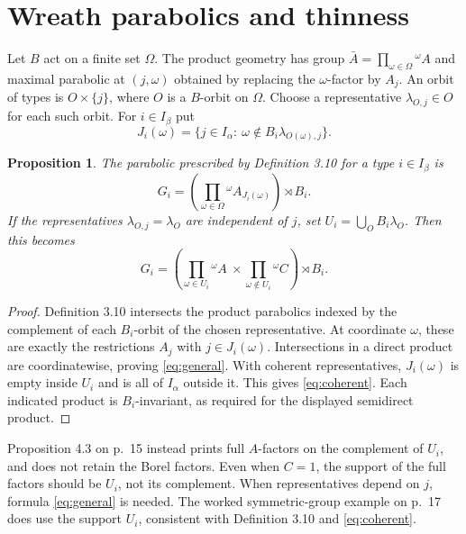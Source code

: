 \documentclass[11pt,a4paper]{article}
\newtheorem{proposition}{Proposition}
\begin{document}
\section{Wreath parabolics and thinness}
Let $B$ act on a finite set $\Omega$. The product geometry has group
$\bar A=\prod_{\omega\in\Omega}{}^\omega A$ and maximal parabolic at
$(j,\omega)$ obtained by replacing the $\omega$-factor by $A_j$.
An orbit of types is $O\times\{j\}$, where $O$ is a $B$-orbit on $\Omega$.
Choose a representative $\lambda_{O,j}\in O$ for each such orbit.
For $i\in I_\beta$ put
\[
 J_i(\omega)=\{j\in I_\alpha:\ 
     \omega\notin B_i\lambda_{O(\omega),j}\}.
\]
\begin{proposition}\label{p:factor}
The parabolic prescribed by Definition 3.10 for a type $i\in I_\beta$ is
\begin{equation}\label{eq:general}
 G_i=\left(\prod_{\omega\in\Omega}{}^\omega A_{J_i(\omega)}\right)\rtimes B_i.
\end{equation}
If the representatives $\lambda_{O,j}=\lambda_O$ are independent of $j$, set
$U_i=\bigcup_O B_i\lambda_O$. Then this becomes
\begin{equation}\label{eq:coherent}
 G_i=\left(\prod_{\omega\in U_i}{}^\omega A\ \times
               \prod_{\omega\notin U_i}{}^\omega C\right)\rtimes B_i.
\end{equation}
\end{proposition}
\begin{proof}
Definition 3.10 intersects the product parabolics indexed by the complement
of each $B_i$-orbit of the chosen representative. At coordinate $\omega$,
these are exactly the restrictions $A_j$ with $j\in J_i(\omega)$.
Intersections in a direct product are coordinatewise, proving
\eqref{eq:general}. With coherent representatives, $J_i(\omega)$ is empty
inside $U_i$ and is all of $I_\alpha$ outside it. This gives
\eqref{eq:coherent}. Each indicated product is $B_i$-invariant, as required
for the displayed semidirect product.
\end{proof}
Proposition 4.3 on p.~15 instead prints full $A$-factors on the complement
of $U_i$, and does not retain the Borel factors. Even when $C=1$, the
support of the full factors should be $U_i$, not its complement. When
representatives depend on $j$, formula \eqref{eq:general} is needed.
The worked symmetric-group example on p.~17 does use the support $U_i$,
consistent with Definition 3.10 and \eqref{eq:coherent}.
\end{document}

